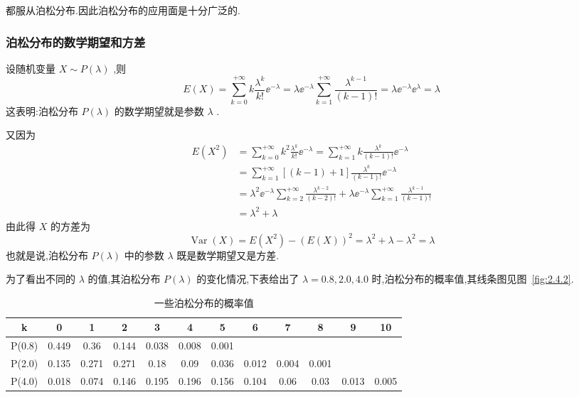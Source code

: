 都服从泊松分布.因此泊松分布的应用面是十分广泛的.

\subsubsection{泊松分布的数学期望和方差}

设随机变量 $ X \sim P(\lambda) $ ,则
\[
E(X)=\sum_{k=0}^{+\infty} k \frac{\lambda^{k}}{k !} \ee ^{-\lambda}=\lambda \ee ^{-\lambda} \sum_{k=1}^{+\infty} \frac{\lambda^{k-1}}{(k-1) !}=\lambda \ee ^{-\lambda} \ee ^{\lambda}=\lambda
\]
这表明:泊松分布 $ P(\lambda) $ 的数学期望就是参数 $ \lambda $ .

又因为
\[
\begin{aligned} E\left(X^{2}\right) &=\sum_{k=0}^{+\infty} k^{2} \frac{\lambda^{k}}{k !} \ee ^{-\lambda}=\sum_{k=1}^{+\infty} k \frac{\lambda^{k}}{(k-1) !} \ee ^{-\lambda} \\ &=\sum_{k=1}^{+\infty}[(k-1)+1] \frac{\lambda^{k}}{(k-1) !} \ee ^{-\lambda} \\ &=\lambda^{2} \ee ^{-\lambda} \sum_{k=2}^{+\infty} \frac{\lambda^{k-2}}{(k-2) !}+\lambda \ee ^{-\lambda} \sum_{k=1}^{+\infty} \frac{\lambda^{k-1}}{(k-1) !} \\ &=\lambda^{2}+\lambda \end{aligned}
\]
由此得 $ X $ 的方差为
\[
\operatorname{Var}(X)=E\left(X^{2}\right)-(E(X))^{2}=\lambda^{2}+\lambda-\lambda^{2}=\lambda
\]
也就是说,泊松分布 $ P(\lambda) $ 中的参数 $ \lambda $ 既是数学期望又是方差.

为了看出不同的 $ \lambda $ 的值,其泊松分布 $ P(\lambda) $ 的变化情况,下表给出了 $ \lambda =
0.8,2.0,4.0 $ 时,泊松分布的概率值,其线条图见图~\ref{fig:2.4.2}.

\begin{table}[htbp]
	\centering
	\caption{一些泊松分布的概率值}
	\begin{tabular}{c|ccccccccccc}
		\toprule
		k     & 0     & 1     & 2     & 3     & 4     & 5     & 6     & 7     & 8     & 9     & 10 \\\midrule
		P(0.8) & 0.449 & 0.36  & 0.144 & 0.038 & 0.008 & 0.001 &       &       &       &       &  \\
		P(2.0) & 0.135 & 0.271 & 0.271 & 0.18  & 0.09  & 0.036 & 0.012 & 0.004 & 0.001 &       &  \\
		P(4.0) & 0.018 & 0.074 & 0.146 & 0.195 & 0.196 & 0.156 & 0.104 & 0.06  & 0.03  & 0.013 & 0.005 \\\bottomrule
	\end{tabular}%
	\label{tab:2.4.2}%
\end{table}%

